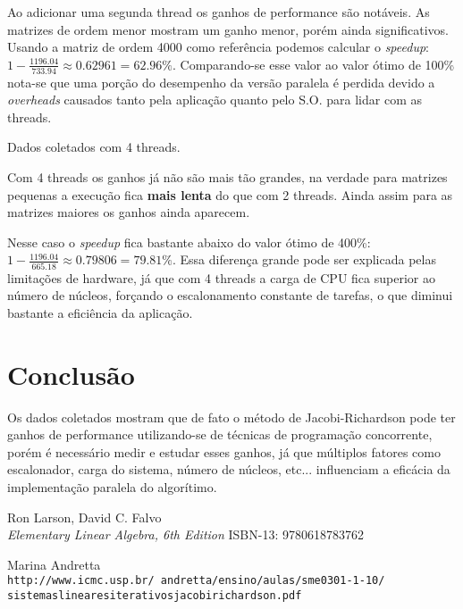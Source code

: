 \documentclass[11pt,towside]{article}
\begin{document}
Ao adicionar uma segunda thread os ganhos de performance são notáveis. As matrizes de ordem menor mostram um ganho menor, porém ainda significativos. Usando a matriz de ordem 4000 como referência podemos calcular o \emph{speedup}: $1-\frac{1196.04}{733.94} \approx 0.62961 = 62.96\%$. Comparando-se esse valor ao valor ótimo de 100\% nota-se que uma porção do desempenho da versão paralela é perdida devido a \emph{overheads} causados tanto pela aplicação quanto pelo S.O. para lidar com as threads.

\begin{table}[h!]\centering
	\caption{Dados coletados com 4 threads.}
\end{table}
Com 4 threads os ganhos já não são mais tão grandes, na verdade para matrizes pequenas a execução fica {\bf mais lenta} do que com 2 threads. Ainda assim para as matrizes maiores os ganhos ainda aparecem.

Nesse caso o \emph{speedup} fica bastante abaixo do valor ótimo de 400\%: $1-\frac{1196.04}{665.18} \approx 0.79806 = 79.81\%$. Essa diferença grande pode ser explicada pelas limitações de hardware, já que com 4 threads a carga de CPU fica superior ao número de núcleos, forçando o escalonamento constante de tarefas, o que diminui bastante a eficiência da aplicação.

\section{Conclusão}
Os dados coletados mostram que de fato o método de Jacobi-Richardson pode ter ganhos de performance utilizando-se de técnicas de programação concorrente, porém é necessário medir e estudar esses ganhos, já que múltiplos fatores como escalonador, carga do sistema, número de núcleos, etc... influenciam a eficácia da implementação paralela do algorítimo.

\begin{thebibliography}{5}
Ron Larson, David C. Falvo
\\\textit{Elementary Linear Algebra, 6th Edition} ISBN-13: 9780618783762
 
Marina Andretta
\\\texttt{http://www.icmc.usp.br/~andretta/ensino/aulas/sme0301-1-10/
\\sistemaslinearesiterativosjacobirichardson.pdf}
\end{thebibliography}
\end{document}
